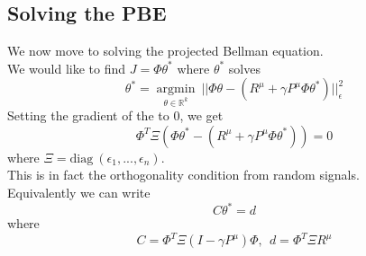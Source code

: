\subsection{Solving the PBE}
We now move to solving the projected Bellman equation.\\
We would like to find $J = \Phi \theta^*$ where $\theta^*$ solves
$$\theta^* = \underset{{\theta \in \mathbb{R}^k}}{\operatorname{argmin}} \ ||\Phi \theta - (R^\mu+\gamma P^\mu\Phi \theta^*)||_\epsilon^2$$
Setting the gradient of the to $0$, we get
$$\Phi^T \Xi (\Phi \theta^* - (R^\mu+\gamma P^\mu \Phi \theta^*)) = 0$$
where $\Xi = \textrm{diag} \ (\epsilon_1,...,\epsilon_n)$.\\
This is in fact the orthogonality condition from random signals.\\
Equivalently we can write
$$C \theta^* = d$$
where
$$C = \Phi^T \Xi(I-\gamma P^\mu) \Phi, \ \ d = \Phi^T\Xi R^\mu$$

